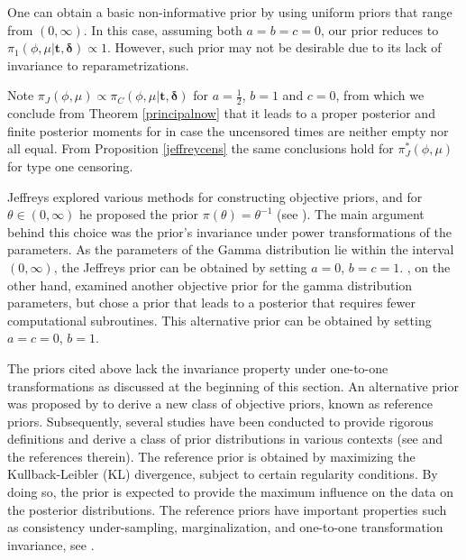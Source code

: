 \documentclass[12pt]{article} %
\theoremstyle{plain}%
\theoremstyle{definition}
\theoremstyle{remark}
\begin{document}
One can obtain a basic non-informative prior by using uniform priors that range from $(0,\infty)$. In this case, assuming both $a=b=c=0$, our prior reduces to $\pi_1(\phi,\mu|\boldsymbol{t,\delta})\propto 1$. However, such prior may not be desirable due to its lack of invariance to reparametrizations.

Note $\pi_J\left(\phi,\mu\right) \propto \pi_C(\phi,\mu|\boldsymbol{t,\delta})$ for $a=\frac{1}{2}$, $b=1$ and $c=0$, from which we conclude from Theorem \ref{principalnow} that it leads to a proper posterior and finite posterior moments for in case the uncensored times are neither empty nor all equal. From Proposition \ref{jeffreycens} the same conclusions hold for $\pi_J^*\left(\phi,\mu\right)$ for type one censoring.


Jeffreys explored various methods for constructing objective priors, and for $\theta\in(0,\infty)$ he proposed the prior $\pi(\theta)=\theta^{-1}$ (see  \cite{kass1996selection}). The main argument behind this choice was the prior's invariance under power transformations of the parameters. As the parameters of the Gamma distribution lie within the interval $(0,\infty)$, the Jeffreys prior can be obtained by setting $a=0$, $b=c=1$.  \cite{miller1980bayesian}, on the other hand, examined another objective prior for the gamma distribution parameters, but chose a prior that leads to a posterior that requires fewer computational subroutines. This alternative prior can be obtained by setting $a=c=0$, $b=1$.

The priors cited above lack the invariance property under one-to-one transformations as discussed at the beginning of this section. An alternative prior was proposed by  \cite{bernardo1979a}  to derive a new class of objective priors, known as reference priors. Subsequently, several studies have been conducted to provide rigorous definitions and derive a class of prior distributions in various contexts (see  \cite{berger2015} and the references therein). The reference prior is obtained by maximizing the Kullback-Leibler (KL) divergence, subject to certain regularity conditions. By doing so, the prior is expected to provide the maximum influence on the data on the posterior distributions. The reference priors have important properties such as consistency under-sampling, marginalization, and one-to-one transformation invariance, see  \cite{bernardo2005}. 
\end{document}
